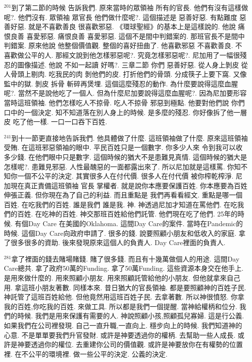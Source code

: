 \documentclass{book}
\begin{document}
$^{201}$到了第二節的時候 告訴我們.
原來當時的眾領袖 所有的官長.
他們有沒有這樣做呢?.
他們沒有.
眾領袖 眾官長 他們做什麼呢?.
這個描述是 惡善好惡.
有點難度 惡善好惡.
就是不喜歡善良 很喜歡邪惡.
《環球聖經》的基本上是這樣說的.
他說 痛恨良善 喜愛邪惡.
痛恨良善 喜愛邪惡.
這個不是間中判錯案的.
那班官長不是間中判錯案.
原來他說 他整個價值觀.
整個的喜好扭曲了.
他喜歡邪惡 不喜歡善良.
不喜歡做公平的人.
那經文說到他怎樣邪惡呢?.
究竟怎樣邪惡呢?.
尼加用了一幅很殘忍的圖像描述.
他說 不如一起讀 好嗎?.
三章二節 你們 惡善好惡.
從人身上剝皮 從人骨頭上剔肉.
吃我民的肉 剝他們的皮.
打折他們的骨頭.
分成筷子上要下窩.
又像監中的獄.
剝皮 拆骨 斬碎再煲埋.
這個這麼殘忍的動作.
為什麼要說得這麼血腥呢?.
當然不是說他吃了一個人.
但為什麼尼加要說得這麼血腥呢?.
因為尼加要形容當時這班領袖.
他們怎樣吃人不掠骨.
吃人不掠骨 邪惡到極點.
他要對他們說 你們口中的一個決定.
知不知道落在別人身上的時候.
是多麼的殘忍.
你好像拆了他一層皮 吃了他一樣.
一口一口吞下百姓.

$^{241}$到十一節更直接地告訴我們.
他具體做了什麼.
這班領袖做了什麼.
原來這班領袖受賄.
在這班邪惡領袖的眼中.
平民百姓只是一個數字.
你多少人來 令到我可以收多少錢.
在他們眼中只是數字.
這個時候的猶大不是患難見真情.
這個時候的猶大是怎樣呢?.
患難見邪惡.
人性最醜惡的一面都露出來了.
所以尼加就是這樣罵.
你知不知你一個不公平的決定.
其實很多人在付代價.
很多人在付代價 被你榨乾榨淨.
尼加現在真正責備這班領袖 官長 掌權者.
就是說你本應要保護百姓.
你本應要為百姓伸張正義.
但你現在為了自己的利益.
而且重點是 我們再看看經文.
重點是哪一個百姓.
在吃我們的百姓.
誰是我們 誰是我.
神.
神透過尼加才知道在罵他們.
在吃我們的百姓.
在吃神的百姓.
神交那班百姓給他們託管.
他們現在吃了他們.
25年的時候.
有個Day Care 在美國的Oklahoma.
這間Day Care的案件.
當時在Pandemic的時候.
這個Day Care向政府申請了.
很多的錢.
說要照顧小朋友和低收入的家庭.
拿了很多很多的資助.
後來發現原來這個人的負責人.
Day Care裡面的負責人.

$^{281}$拿了裡面的錢去賭場賭錢.
賭了很多錢.
而且有十幾萬做個人的用途.
這間Day Care總共.
拿了政府50萬的Funding.
拿了50萬Funding.
這些資源本身交在他手上.
是用來做什麼的.
用來照顧小朋友.
用來照顧託管給他的小朋友.
但他就拿來自己用.
拿這班小朋友著數.
同樣本來.
昔日猶大的官長領袖.
都是要照顧神的百姓子民.
神託管了這班百姓給他.
但他竟然用這班百姓子民.
去拿著數.
所以神很憤怒.
你拿我的百姓,你吃我的百姓.
來做工具.
所以都是我們一個提醒.
當神給權柄和位分.
我們的時候.
我們是用來保護有需要的人.
神說照顧小孩,照顧孤兒寡婦.
這是行公義.
如果我們在公司裡發現.
自己一直升職,一直向上.
穩步向上的時候.
我們知道神的心意.
不是單單要我們升官發財.
或許是神要透過你的權柄.
去幫助一些人成長.
或許是神要透過你的權位.
去重建你公司的價值觀.
或許是神要放你在有權勢的位置裡.
在不公平的環境裡.
做一些公平的決定.
公義的決定.
\end{document}
